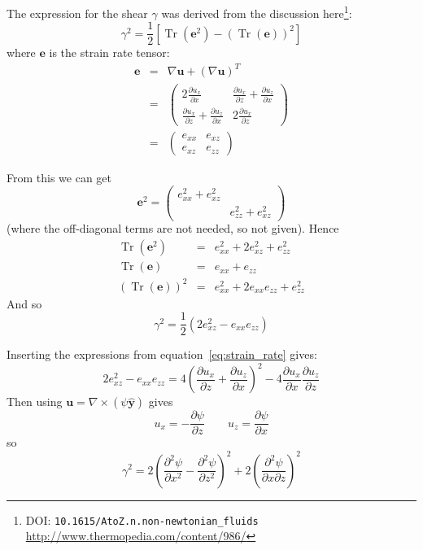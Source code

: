 \documentclass[12pt,a4paper]{article}
\DeclareMathOperator{\Tr}{Tr}
\begin{document}
The expression for the shear $\gamma$ was derived from the discussion here\footnote{DOI: \texttt{10.1615/AtoZ.n.non-newtonian\_fluids} \url{http://www.thermopedia.com/content/986/}}:
\begin{equation}
\gamma^2 = \frac{1}{2}\left[\Tr{\left(\mathbf{e}^2\right)} - \left(\Tr\left(\mathbf{e}\right)\right)^2\right]
\end{equation}
where $\mathbf{e}$ is the strain rate tensor:
\begin{eqnarray}
  \mathbf{e} &=& \nabla\mathbf{u} + \left(\nabla\mathbf{u}\right)^T \\
  &=& \left(\begin{array}{cc}
    2\frac{\partial u_x}{\partial x} & \frac{\partial u_x}{\partial z} + \frac{\partial u_z}{\partial x} \\
    \frac{\partial u_x}{\partial z} + \frac{\partial u_z}{\partial x} & 2\frac{\partial u_x}{\partial z} \end{array}\right) \label{eq:strain_rate} \\
  &=&  \left(\begin{array}{cc}
  e_{xx} & e_{xz} \\
  e_{xz} & e_{zz} \end{array}\right)
\end{eqnarray}

From this we can get
\[
\mathbf{e}^2 =  \left(\begin{array}{cc}
  e_{xx}^2 + e_{xz}^2 &  \\
   & e_{zz}^2 + e_{xz}^2 \end{array}\right)
\]
(where the off-diagonal terms are not needed, so not given).
Hence
\begin{eqnarray*}
  \Tr\left(\mathbf{e}^2\right) &=& e_{xx}^2 + 2e_{xz}^2 + e_{zz}^2 \\
  \Tr\left(\mathbf{e}\right) &=& e_{xx} + e_{zz} \\
  \left(\Tr\left(\mathbf{e}\right)\right)^2 &=& e_{xx}^2 + 2e_{xx}e_{zz} + e_{zz}^2
\end{eqnarray*}
And so
\begin{equation}
  \gamma^2 = \frac{1}{2}\left(2e_{xz}^2 - e_{xx}e_{zz}\right)
\end{equation}

Inserting the expressions from equation~\ref{eq:strain_rate} gives:
\[
2e_{xz}^2 - e_{xx}e_{zz} = 4\left(\frac{\partial u_x}{\partial z} + \frac{\partial u_z}{\partial x}\right)^2 - 4\frac{\partial u_x}{\partial x}\frac{\partial u_z}{\partial z}
\]
Then using $\mathbf{u} = \nabla\times\left(\psi\hat{\mathbf{y}}\right)$ gives
\[
u_x = -\frac{\partial \psi}{\partial z} \qquad u_z = \frac{\partial \psi}{\partial x}
\]
so
\[
\gamma^2 = 2\left(\frac{\partial^2 \psi}{\partial x^2} - \frac{\partial^2 \psi}{\partial z^2}\right)^2 + 2\left(\frac{\partial^2 \psi}{\partial x\partial z}\right)^2
\]
\end{document}
